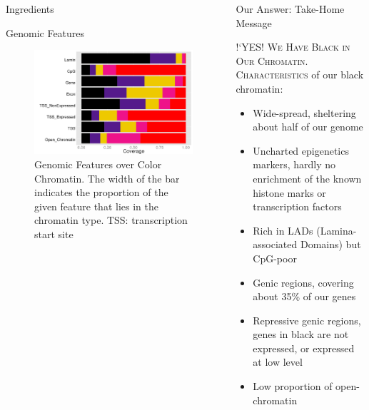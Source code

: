\documentclass[serif,mathserif,final]{beamer}
\begin{document}
\begin{frame}{}
\begin{columns}[t]
\begin{column}{0.32\linewidth}
\begin{block}{Ingredients}
      \end{block}
            
      \begin{block}{Genomic Features}
      		\begin{figure}
					\includegraphics[width=1\textwidth]{GenomicFeatures}
					\caption{Genomic Features over Color Chromatin. The width of the bar indicates the proportion of the given feature that lies in the chromatin type. TSS: transcription start site}
			\end{figure}
      \end{block}



    \end{column}%

    \begin{column}{0.32\linewidth}

      \begin{block}{Our Answer: Take-Home Message}
       
       \lettrine[lines=1,findent=0pt, nindent=1pt]{!`YES!}{ We Have Black in Our Chromatin.}\\[20pt]
        
        \lettrine[lines=1,findent=0pt, nindent=1pt]{C}{haracteristics} of our black chromatin:
        \begin{itemize}
        	  \item Wide-spread, sheltering about half of our genome
          \item Uncharted epigenetics markers, hardly no enrichment of the known histone marks or transcription factors
          \item Rich in LADs (Lamina-associated Domains) but CpG-poor
          \item Genic regions, covering about 35\% of our genes
          \item Repressive genic regions, genes in black are not expressed, or expressed at low level
          \item Low proportion of open-chromatin\\[20pt]
        \end{itemize} 
        

\end{block}
\end{column}
\end{columns}
\end{frame}
\end{document}
